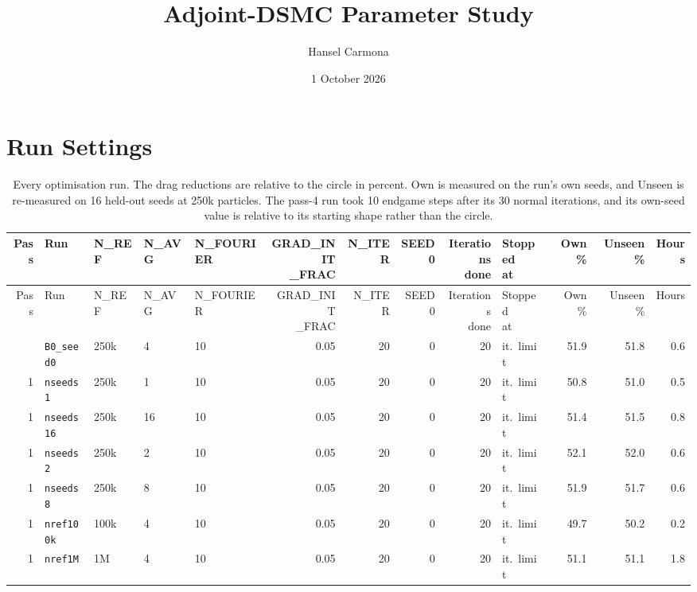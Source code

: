 \documentclass[10pt]{article}
\title{Adjoint-DSMC Parameter Study}
\author{Hansel Carmona}
\date{1 October 2026}
\begin{document}
\maketitle
\tableofcontents
\clearpage

\section{Run Settings}\label{sec:runs}
{\scriptsize\setlength{\tabcolsep}{1.6pt}
\begin{longtable}{rllllrrrrlrrr}
\caption{\label{tab:runs}Every optimisation run. The drag reductions are relative to the circle in percent. Own is measured on the run's own seeds, and Unseen is re-measured on 16 held-out seeds at 250k particles. The pass-4 run took 10 endgame steps after its 30 normal iterations, and its own-seed value is relative to its starting shape rather than the circle.}\\
\toprule
Pass & Run & N\_REF & N\_AVG & N\_FOURIER & \shortstack{GRAD\_INIT\\\_FRAC} & N\_ITER & SEED0 & \shortstack{Iterations\\done} & \shortstack{Stopped\\at} & Own \% & Unseen \% & Hours \\
\midrule
\endfirsthead
\toprule
Pass & Run & N\_REF & N\_AVG & N\_FOURIER & \shortstack{GRAD\_INIT\\\_FRAC} & N\_ITER & SEED0 & \shortstack{Iterations\\done} & \shortstack{Stopped\\at} & Own \% & Unseen \% & Hours \\
\midrule
\endhead
\bottomrule
\endfoot
1 & \texttt{B0\_seed0} & 250k & 4 & 10 & 0.05 & 20 & 0 & 20 & it.\ limit & 51.9 & 51.8 & 0.6 \\
1 & \texttt{nseeds1} & 250k & 1 & 10 & 0.05 & 20 & 0 & 20 & it.\ limit & 50.8 & 51.0 & 0.5 \\
1 & \texttt{nseeds16} & 250k & 16 & 10 & 0.05 & 20 & 0 & 20 & it.\ limit & 51.4 & 51.5 & 0.8 \\
1 & \texttt{nseeds2} & 250k & 2 & 10 & 0.05 & 20 & 0 & 20 & it.\ limit & 52.1 & 52.0 & 0.6 \\
1 & \texttt{nseeds8} & 250k & 8 & 10 & 0.05 & 20 & 0 & 20 & it.\ limit & 51.9 & 51.7 & 0.6 \\
1 & \texttt{nref100k} & 100k & 4 & 10 & 0.05 & 20 & 0 & 20 & it.\ limit & 49.7 & 50.2 & 0.2 \\
1 & \texttt{nref1M} & 1M & 4 & 10 & 0.05 & 20 & 0 & 20 & it.\ limit & 51.1 & 51.1 & 1.8 \\

\end{longtable}}
\end{document}
